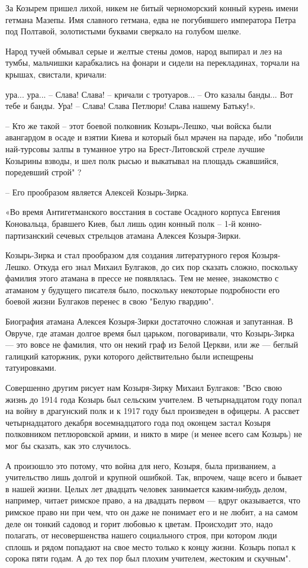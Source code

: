За Козырем пришел лихой, никем не битый черноморский конный курень имени
гетмана Мазепы. Имя славного гетмана, едва не погубившего императора Петра
под Полтавой, золотистыми буквами сверкало на голубом шелке. 

Народ тучей обмывал серые и желтые стены домов, народ выпирал и лез на тумбы,
мальчишки карабкались на фонари и сидели на перекладинах, торчали на крышах,
свистали, кричали:

ура... ура... – Слава! Слава! – кричали с тротуаров... – Ото казалы банды...
Вот тебе и банды. Ура! – Слава! Слава Петлюри! Слава нашему Батьку!».


– Кто же такой – этот боевой полковник Козырь-Лешко, чьи войска были
авангардом в осаде и взятии Киева и который был мрачен на параде, ибо
"побили най-турсовы залпы в туманное утро на Брест-Литовской стреле лучшие
Козырины взводы, и шел полк рысью и выкатывал на площадь сжавшийся,
поредевший строй" ?

– Его прообразом является Алексей Козырь-Зирка.

«Во время Антигетманского восстания в составе Осадного корпуса Евгения
Коновальца, бравшего Киев, был лишь один конный полк – 1-й конно- партизанский
сечевых стрельцов атамана Алексея Козыря-Зирки. 

Козырь-Зирка и стал прообразом для создания литературного героя Козыря-Лешко.
Откуда его знал Михаил Булгаков, до сих пор сказать сложно, поскольку фамилия
этого атамана в прессе не появлялась. Тем не менее, знакомство с атаманом у
будущего писателя было, поскольку некоторые подробности его боевой жизни
Булгаков перенес в свою "Белую гвардию".

Биография атамана Алексея Козыря-Зирки достаточно сложная и запутанная. В
Овруче, где атаман долгое время был царьком, поговаривали, что Козырь-Зирка —
это вовсе не фамилия, что он некий граф из Белой Церкви, или же — беглый
галицкий каторжник, руки которого действительно были испещрены татуировками.

Совершенно другим рисует нам Козыря-Зирку Михаил Булгаков: "Всю свою жизнь до
1914 года Козырь был сельским учителем. В четырнадцатом году попал на войну в
драгунский полк и к 1917 году был произведен в офицеры. А рассвет
четырнадцатого декабря восемнадцатого года под оконцем застал Козыря
полковником петлюровской армии, и никто в мире (и менее всего сам Козырь) не
мог бы сказать, как это случилось. 

А произошло это потому, что война для него, Козыря, была призванием, а
учительство лишь долгой и крупной ошибкой. Так, впрочем, чаще всего и
бывает в нашей жизни. Целых лет двадцать человек занимается каким-нибудь
делом, например, читает римское право, а на двадцать первом — вдруг
оказывается, что римское право ни при чем, что он даже не понимает его и
не любит, а на самом деле он тонкий садовод и горит любовью к цветам.
Происходит это, надо полагать, от несовершенства нашего социального строя,
при котором люди сплошь и рядом попадают на свое место только к концу
жизни. Козырь попал к сорока пяти годам. А до тех пор был плохим учителем,
жестоким и скучным".

